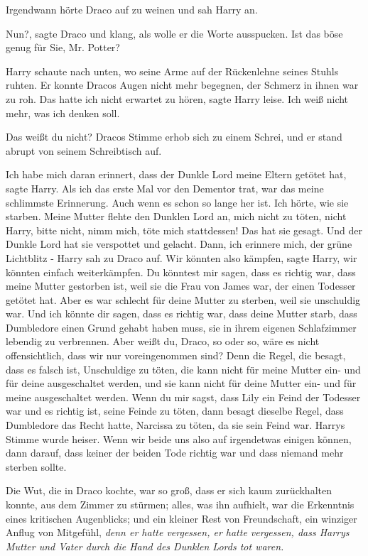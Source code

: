 Irgendwann hörte Draco auf zu weinen und sah Harry an.

\glqq{}Nun?\grqq{}, sagte Draco und klang, als wolle er die Worte ausspucken.
\glqq{}Ist das böse genug für Sie, Mr. Potter?\grqq{}

Harry schaute nach unten, wo seine Arme auf der Rückenlehne seines Stuhls
ruhten. Er konnte Dracos Augen nicht mehr begegnen, der Schmerz in ihnen war zu
roh. \glqq{}Das hatte ich nicht erwartet zu hören\grqq{}, sagte Harry leise.
\glqq{}Ich weiß nicht mehr, was ich denken soll.\grqq{}

\glqq{}Das weißt du nicht?\grqq{} Dracos Stimme erhob sich zu einem Schrei, und
er stand abrupt von seinem Schreibtisch auf.

\glqq{}Ich habe mich daran erinnert, dass der Dunkle Lord meine Eltern getötet
hat\grqq{}, sagte Harry. \glqq{}Als ich das erste Mal vor den Dementor trat, war
das meine schlimmste Erinnerung. Auch wenn es schon so lange her ist. Ich hörte,
wie sie starben. Meine Mutter flehte den Dunklen Lord an, mich nicht zu töten,
nicht Harry, bitte nicht, nimm mich, töte mich stattdessen! Das hat sie gesagt.
Und der Dunkle Lord hat sie verspottet und gelacht. Dann, ich erinnere mich, der
grüne Lichtblitz -\grqq{} Harry sah zu Draco auf. \glqq{}Wir könnten also
kämpfen\grqq{}, sagte Harry, \glqq{}wir könnten einfach weiterkämpfen. Du
könntest mir sagen, dass es richtig war, dass meine Mutter gestorben ist, weil
sie die Frau von James war, der einen Todesser getötet hat. Aber es war schlecht
für deine Mutter zu sterben, weil sie unschuldig war. Und ich könnte dir sagen,
dass es richtig war, dass deine Mutter starb, dass Dumbledore einen Grund gehabt
haben muss, sie in ihrem eigenen Schlafzimmer lebendig zu verbrennen. Aber weißt
du, Draco, so oder so, wäre es nicht offensichtlich, dass wir nur voreingenommen
sind? Denn die Regel, die besagt, dass es falsch ist, Unschuldige zu töten, die
kann nicht für meine Mutter ein- und für deine ausgeschaltet werden, und sie
kann nicht für deine Mutter ein- und für meine ausgeschaltet werden. Wenn du mir
sagst, dass Lily ein Feind der Todesser war und es richtig ist, seine Feinde zu
töten, dann besagt dieselbe Regel, dass Dumbledore das Recht hatte, Narcissa zu
töten, da sie sein Feind war.\grqq{} Harrys Stimme wurde heiser. \glqq{}Wenn wir
beide uns also auf irgendetwas einigen können, dann darauf, dass keiner der
beiden Tode richtig war und dass niemand mehr sterben sollte.\grqq{}

Die Wut, die in Draco kochte, war so groß, dass er sich kaum zurückhalten
konnte, aus dem Zimmer zu stürmen; alles, was ihn aufhielt, war die Erkenntnis
eines kritischen Augenblicks; und ein kleiner Rest von Freundschaft, ein
winziger Anflug von Mitgefühl, \emph{denn er hatte vergessen, er hatte
vergessen, dass Harrys Mutter und Vater durch die Hand des Dunklen Lords tot
waren.}

